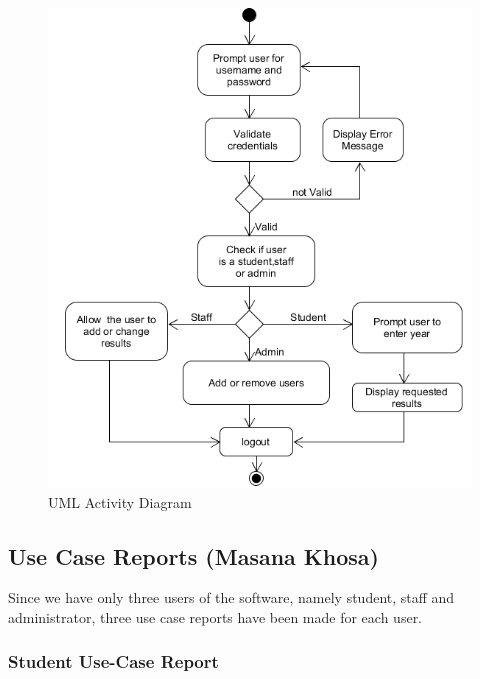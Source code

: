 \documentclass[10pt,onecolumn]{RequimentsGathering}
\begin{document}
	\begin{center}
		\begin{figure}[h]
			\centering
			\includegraphics[trim={0cm 0 0 0},clip]{UML-Activity}
			\caption{UML Activity Diagram}
		\end{figure}
	\end{center}
	
	\subsection{Use Case Reports (Masana Khosa)}
	Since we have only three users of the software, namely student, staff and administrator, three use case reports have been made for each user. 
	
	
	\clearpage
	\subsubsection{Student Use-Case Report}$\;\;\;\;\;\;\;\;\;\;\;\;\;\;\;\;\;\;\;\;\;\;\;$
	
\end{document}
